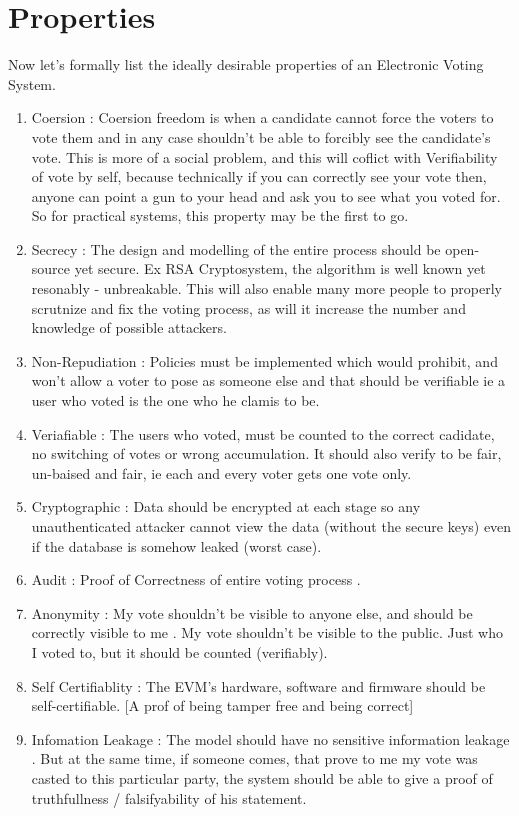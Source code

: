 \documentclass[12pt]{report}
\begin{document}
\section{Properties}
Now let's formally list the ideally desirable properties of an Electronic Voting System.
\begin{enumerate}
  \item Coersion : Coersion freedom is when a candidate cannot force the voters to vote them and in any case shouldn't be able to forcibly see the candidate's vote. This is more of a social problem, and this will coflict with Verifiability of vote by self, because technically if you can correctly see your vote then, anyone can point a gun to your head and ask you to see what you voted for.  \\
  So for practical systems, this property may be the first to go.
  \item Secrecy : The design and modelling of the entire process should be open-source yet secure. Ex RSA Cryptosystem, the algorithm is well known yet resonably - unbreakable. This will also enable many more people to properly scrutnize and fix the voting process, as will it increase the number and knowledge of possible attackers. 
  \item Non-Repudiation : Policies must be implemented which would prohibit, and won't allow a voter to pose as someone else and that should be verifiable ie a user who voted is the one who he clamis to be.
  \item Veriafiable : The users who voted, must be counted to the correct cadidate, no switching of votes or wrong accumulation. It should also verify to be fair, un-baised and fair, ie each and every voter gets one vote only. 
  \item Cryptographic : Data should be encrypted at each stage so any unauthenticated attacker cannot view the data (without the secure keys) even if the database is somehow leaked (worst case).
  \item Audit : Proof of Correctness of entire voting process .
  \item Anonymity : My vote shouldn't be visible to anyone else, and should be correctly visible to me .
  My vote shouldn't be visible to the public. Just who I voted to, but it should be counted (verifiably). 
  \item Self Certifiablity : The EVM's hardware, software and firmware should be self-certifiable. [A prof of being tamper free and being correct]
  \item Infomation Leakage : The model should have no sensitive information leakage . But at the same time, if someone comes, that prove to me my vote was casted to this particular party, the system should be able to give a proof of truthfullness / falsifyability of his statement.
\end{enumerate}
\end{document}

